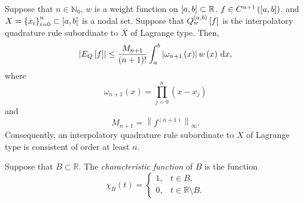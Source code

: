 \begin{frame}
	\begin{theorem}
		Suppose that $n\in\mathbb{N}_{0}$, $w$ is a weight function
		on
		\begin{math}
			\left[a,b\right]\subset
			\mathbb{R}
		\end{math}.
		\begin{math}
			f\in C^{n+1}
			\left(
			\left[a,b\right]
			\right)
		\end{math},
		and
		\begin{math}
			X=
			\left\{x_{i}\right\}_{i=0}^{n}\subset
			\left[a,b\right]
		\end{math}
		is a nodal set.
		Suppose that
		\begin{math}
			Q^{\left(a,b\right)}_{w}
			\left[f\right]
		\end{math}
		is the interpolatory quadrature rule subordinate to $X$ of Lagrange type.
		Then,
		\begin{equation*}
			\left|
			E_{Q}
			\left[f\right]
			\right|\leq
			\dfrac{M_{n+1}}{\left(n+1\right)!}
			\int_{a}^{b}
			\left|
			\omega_{n+1}
			\left(x\right)
			\right|
			w\left(x\right)
			\dl x,
		\end{equation*}
		where
		\begin{equation*}
			\omega_{n+1}
			\left(x\right)=
			\prod\limits_{j=0}^{n}
			\left(x-x_{j}\right)
		\end{equation*}
		and
		\begin{equation*}
			M_{n+1}=
			{\left\|
			f^{\left(n+1\right)}
			\right\|}_{\infty}.
		\end{equation*}
		Consequently, an interpolatory quadrature rule subordinate to
		$X$ of Lagrange type is consistent of order at least $n$.
	\end{theorem}
	\begin{definition}
		Suppose that $B\subset\mathbb{R}$.
		The \emph{characteristic function} of $B$ is the function
		\begin{equation*}
			\chi_{B}\left(t\right)=
			\begin{cases}
				1, & t\in B,                    \\
				0, & t\in\mathbb{R}\setminus B.
			\end{cases}
		\end{equation*}
	\end{definition}
\end{frame}

